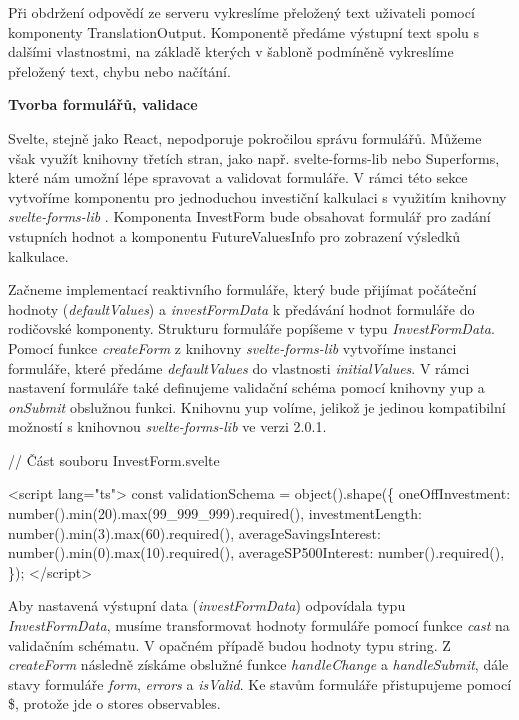 Při obdržení odpovědí ze serveru vykreslíme přeložený text uživateli pomocí komponenty TranslationOutput. 
Komponentě předáme výstupní text spolu s dalšími vlastnostmi, na základě kterých v šabloně podmíněně vykreslíme přeložený text, chybu nebo načítání.

\begin{flushleft}
  \textbf{Tvorba formulářů, validace}
\end{flushleft}

Svelte, stejně jako React, nepodporuje pokročilou správu formulářů. Můžeme však využít knihovny třetích stran, jako např. svelte-forms-lib nebo Superforms, které nám umožní lépe spravovat a validovat formuláře. 
V rámci této sekce vytvoříme komponentu pro jednoduchou investiční kalkulaci s využitím knihovny \emph{svelte-forms-lib} \cite{svelteformslib}. 
Komponenta InvestForm bude obsahovat formulář pro zadání vstupních hodnot a komponentu FutureValuesInfo pro zobrazení výsledků kalkulace.

Začneme implementací reaktivního formuláře, který bude přijímat počáteční hodnoty (\emph{defaultValues}) a \emph{investFormData} k předávání hodnot formuláře do rodičovské komponenty. 
Strukturu formuláře popíšeme v typu \emph{InvestFormData}. Pomocí funkce \emph{createForm} z knihovny \emph{svelte-forms-lib} vytvoříme instanci formuláře, které předáme \emph{defaultValues} do vlastnosti \emph{initialValues}. 
V rámci nastavení formuláře také definujeme validační schéma pomocí knihovny yup \cite{yuplibrary} a \emph{onSubmit} obslužnou funkci. Knihovnu yup volíme, jelikož je jedinou kompatibilní možností s knihovnou \emph{svelte-forms-lib} ve verzi 2.0.1. 

\begin{prog}
// Část souboru InvestForm.svelte

<script lang="ts">
  const validationSchema = object().shape(\{
    oneOffInvestment: number().min(20).max(99_999_999).required(),
    investmentLength: number().min(3).max(60).required(),
    averageSavingsInterest: number().min(0).max(10).required(),
    averageSP500Interest: number().required(),
  \});
</script>
\end{prog}

Aby nastavená výstupní data (\emph{investFormData}) odpovídala typu \emph{InvestFormData}, musíme transformovat hodnoty formuláře pomocí funkce \emph{cast} na validačním schématu. V opačném případě budou hodnoty typu string. 
Z \emph{createForm} následně získáme obslužné funkce \emph{handleChange} a \emph{handleSubmit}, dále stavy formuláře \emph{form}, \emph{errors} a \emph{isValid}. Ke stavům formuláře přistupujeme pomocí \$, protože jde o stores observables.

